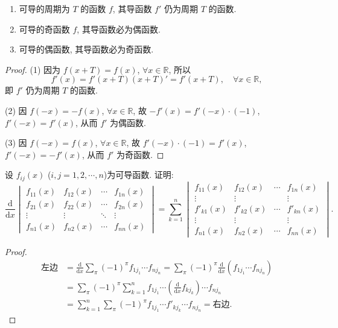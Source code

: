 \begin{example}\label{ex:3.1.11}
\begin{enumerate}[label=(\arabic*)]
  \item 可导的周期为 $T$ 的函数 $f$, 其导函数 $f'$ 仍为周期 $T$ 的函数.
  \item 可导的奇函数 $f$, 其导函数必为偶函数.
  \item 可导的偶函数, 其导函数必为奇函数.
\end{enumerate}
\end{example}

\begin{proof}
(1) 因为 $f(x+T) = f(x)$, $\forall x \in \mathbb{R}$, 所以
\[
f'(x) = f'(x+T)(x+T)' = f'(x+T),\quad \forall x \in \mathbb{R},
\]
即 $f'$ 仍为周期 $T$ 的函数.

(2) 因 $f(-x) = -f(x)$, $\forall x \in \mathbb{R}$, 故 $-f'(x) = f'(-x)\cdot(-1)$, $f'(-x) = f'(x)$, 从而 $f'$ 为偶函数.

(3) 因 $f(-x) = f(x)$, $\forall x \in \mathbb{R}$, 故 $f'(-x)\cdot(-1) = f'(x)$, $f'(-x) = -f'(x)$, 从而 $f'$ 为奇函数.
\end{proof}

\begin{example}\label{ex:3.1.12}
设 $f_{ij}(x)$ ($i,j = 1, 2, \cdots, n$)为可导函数. 证明:
\[
\frac{\mathrm{d}}{\mathrm{d}x}
\begin{vmatrix}
f_{11}(x) & f_{12}(x) & \cdots & f_{1n}(x)\\
f_{21}(x) & f_{22}(x) & \cdots & f_{2n}(x)\\
\vdots & \vdots & \ddots & \vdots\\
f_{n1}(x) & f_{n2}(x) & \cdots & f_{nn}(x)
\end{vmatrix}
=
\sum_{k=1}^{n}
\begin{vmatrix}
f_{11}(x) & f_{12}(x) & \cdots & f_{1n}(x)\\
\vdots & \vdots & & \vdots\\
f'_{k1}(x) & f'_{k2}(x) & \cdots & f'_{kn}(x)\\
\vdots & \vdots & & \vdots\\
f_{n1}(x) & f_{n2}(x) & \cdots & f_{nn}(x)
\end{vmatrix}.
\]
\end{example}

\begin{proof}
\[
\begin{aligned}
\text{左边} &= \frac{\mathrm{d}}{\mathrm{d}x}\sum_{\pi}(-1)^{\pi}f_{1j_1}\cdots f_{nj_n} = \sum_{\pi}(-1)^{\pi}\frac{\mathrm{d}}{\mathrm{d}x}(f_{1j_1}\cdots f_{nj_n})\\
&= \sum_{\pi}(-1)^{\pi}\sum_{k=1}^{n}f_{1j_1}\cdots\left(\frac{\mathrm{d}}{\mathrm{d}x}f_{kj_k}\right)\cdots f_{nj_n}\\
&= \sum_{k=1}^{n}\sum_{\pi}(-1)^{\pi}f_{1j_1}\cdots f'_{kj_k}\cdots f_{nj_n} = \text{右边}.
\end{aligned}
\]
\end{proof}

